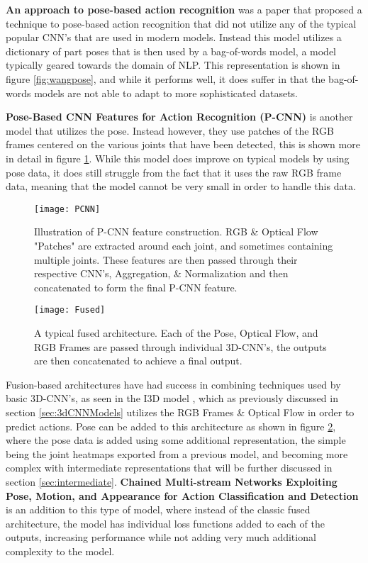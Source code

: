 \textbf{An approach to pose-based action recognition} \cite{WangPose} was a paper that proposed a technique to pose-based action recognition that did not utilize any of the typical popular CNN's that are used in modern models. Instead this model utilizes a dictionary of part poses that is then used by a bag-of-words model, a model typically geared towards the domain of NLP. This representation is shown in figure \ref{fig:wangpose}, and  while it performs well, it does suffer in that the bag-of-words models are not able to adapt to more sophisticated datasets.

\textbf{Pose-Based CNN Features for Action Recognition (P-CNN)} \cite{PCNN} is another model that utilizes the pose. Instead however, they use patches of the RGB frames centered on the various joints that have been detected, this is shown more in detail in figure \ref{fig:pcnn}. While this model does improve on typical models by using pose data, it does still struggle from the fact that it uses the raw RGB frame data, meaning that the model cannot be very small in order to handle this data.

\begin{figure}[h]
	\texttt{[image: PCNN]}
	\centering
	\caption{Illustration of P-CNN feature construction. RGB \& Optical Flow "Patches" are extracted around each joint, and sometimes containing multiple joints. These features are then passed through their respective CNN's, Aggregation, \& Normalization and then concatenated to form the final P-CNN feature.}
	\label{fig:pcnn}
\end{figure}

\begin{figure}[h]
	\texttt{[image: Fused]}
	\centering
	\caption{A typical fused architecture. Each of the Pose, Optical Flow, and RGB Frames are passed through individual 3D-CNN's, the outputs are then concatenated to achieve a final output.}
	\label{fig:fused}
\end{figure}

Fusion-based architectures have had success in combining techniques used by basic 3D-CNN's, as seen in the I3D model \cite{i3d}, which as previously discussed in section \ref{sec:3dCNNModels} utilizes the RGB Frames \& Optical Flow in order to predict actions. Pose can be added to this architecture as shown in figure \ref{fig:fused}, where the pose data is added using some additional representation, the simple being the joint heatmaps exported from a previous model, and becoming more complex with intermediate representations that will be further discussed in section \ref{sec:intermediate}. \textbf{Chained Multi-stream Networks Exploiting Pose, Motion, and Appearance for Action Classification and Detection} \cite{Chained} is an addition to this type of model, where instead of the classic fused architecture, the model has individual loss functions added to each of the outputs, increasing performance while not adding very much additional complexity to the model.

